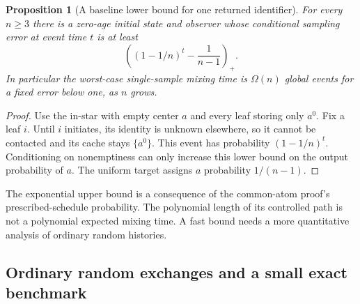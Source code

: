 \documentclass[11pt]{article}
\newtheorem{proposition}[theorem]{Proposition}
\begin{document}
\begin{proposition}[A baseline lower bound for one returned identifier]
\label{prop:c2samplelower}
For every $n\ge3$ there is a zero-age initial state and
observer whose conditional sampling error at event time $t$ is at least
\[
 \left((1-1/n)^t-\frac1{n-1}\right)_+.
\]
In particular the worst-case single-sample mixing time
is $\Omega(n)$ global events for a fixed error below one,
as $n$ grows.
\end{proposition}
\begin{proof}
Use the in-star with empty center $a$ and every leaf
storing only $a^0$. Fix a leaf $i$.
Until $i$ initiates, its identity is unknown elsewhere,
so it cannot be contacted and its cache stays $\{a^0\}$.
This event has probability $(1-1/n)^t$.
Conditioning on nonemptiness can only increase this
lower bound on the output probability of $a$.
The uniform target assigns $a$ probability $1/(n-1)$.
\end{proof}

The exponential upper bound is a consequence of the
common-atom proof's prescribed-schedule probability.
The polynomial length of its controlled path is not
a polynomial expected mixing time. A fast bound needs
a more quantitative analysis of ordinary random histories.

\subsection{Ordinary random exchanges and a small exact benchmark}
\end{document}
